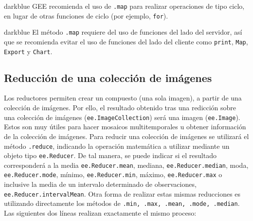 \documentclass[
  12pt,
  letterpaper,
  twoside]{book}
\begin{document}
\begin{bluebox2}

\begin{awesomeblock}{5pt}{\faLightbulb}{darkblue}
GEE recomienda el uso de \texttt{.map} para realizar operaciones de tipo ciclo, en lugar de otras funciones de ciclo (por ejemplo, \texttt{for}).

\end{awesomeblock}

\end{bluebox2}

\begin{bluebox2}

\begin{awesomeblock}{5pt}{\faLightbulb}{darkblue}
El método \texttt{.map} requiere del uso de funciones del lado del servidor, así que se recomienda evitar el uso de funciones del lado del cliente como \texttt{print}, \texttt{Map}, \texttt{Export} y \texttt{Chart}.

\end{awesomeblock}

\end{bluebox2}

\hypertarget{reducciuxf3n-de-una-colecciuxf3n-de-imuxe1genes}{%
\subsection{Reducción de una colección de imágenes}\label{reducciuxf3n-de-una-colecciuxf3n-de-imuxe1genes}}

Los reductores permiten crear un compuesto (una sola imagen), a partir de una colección de imágenes. Por ello, el resultado obtenido tras una redicción sobre una colección de imágenes (\texttt{ee.ImageCollection}) será una imagen (\texttt{ee.Image}). Estos son muy útiles para hacer mosaicos multitemporales u obtener información de la colección de imágenes. Para reducir una colección de imágenes se utilizará el método \texttt{.reduce}, indicando la operación matemática a utilizar mediante un objeto tipo \texttt{ee.Reducer}. De tal manera, se puede indicar si el resultado corresponderá a la media \texttt{ee.Reducer.mean}, mediana, \texttt{ee.Reducer.median}, moda, \texttt{ee.Reducer.mode}, mínimo, \texttt{ee.Reducer.min}, máximo, \texttt{ee.Reducer.max} o inclusive la media de un intervalo determinado de observaciones, \texttt{ee.Reducer.intervalMean}. Otra forma de realizar estas mismas reducciones es utilizando directamente los métodos de \texttt{.min,\ .max,\ .mean,\ .mode,\ .median}. Las siguientes dos líneas realizan exactamente el mismo proceso:
\end{document}
